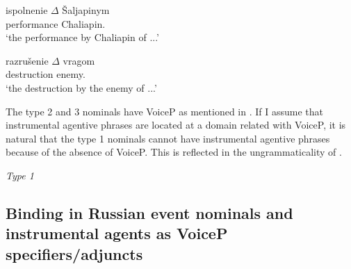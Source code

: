 \documentclass[output=paper,
]{langscibook}
\begin{document}
\begin{exe}
\ex\label{II}
\begin{xlist}
\end{xlist}
\end{exe}

\begin{exe}
\ex\label{DI}
\begin{xlist}
\ex\label{ispdI}
\gll ispolnenie $\Delta$ Šaljapinym \\  %
	performance {} Chaliapin.{\INS}\\
\trans `the performance by Chaliapin of ...'

\ex\label{razdI}
\gll razrušenie $\Delta$ vragom\\
	destruction {} enemy.{\INS}\\
\trans `the destruction by the enemy of ...' 
\end{xlist}
\end{exe}

\noindent
The type 2 and 3 nominals have VoiceP as mentioned in . 
If I assume that instrumental agentive phrases are located at a domain related with VoiceP, it is natural that the type 1 nominals cannot have  instrumental agentive phrases because of the absence of VoiceP.
This is reflected in the ungrammaticality of .

\begin{exe}
\ex\label{ud} \textit{Type 1}
\begin{xlist}

\end{xlist}
\end{exe}


\subsection{Binding in Russian event nominals and instrumental agents as VoiceP specifiers/adjuncts}
\end{document}
